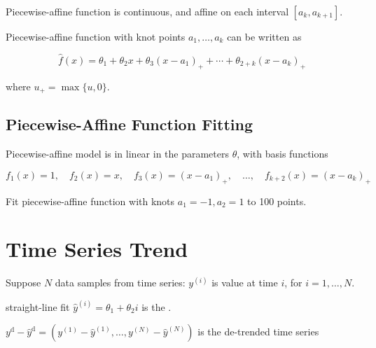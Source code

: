 \begin{proposition}
    Piecewise-affine function is continuous, and affine on each interval $ \left[a_{k}, a_{k+1}\right] $.
\end{proposition}

\begin{theorem}
    Piecewise-affine function with knot points $ a_{1}, \ldots, a_{k} $ can be written as

    $$
    \hat{f}(x)=\theta_{1}+\theta_{2} x+\theta_{3}\left(x-a_{1}\right)_{+}+\cdots+\theta_{2+k}\left(x-a_{k}\right)_{+}
    $$

    where $ u_{+}=\max \{u, 0\} $.
\end{theorem}



\subsection{Piecewise-Affine Function Fitting}

Piecewise-affine model is in linear in the parameters $ \theta $, with basis functions

$$
f_{1}(x)=1, \quad f_{2}(x)=x, \quad f_{3}(x)=\left(x-a_{1}\right)_{+}, \quad \ldots, \quad f_{k+2}(x)=\left(x-a_{k}\right)_{+}
$$

\begin{example}
    Fit piecewise-affine function with knots $ a_{1}=-1, a_{2}=1 $ to 100 points.
\end{example}

\section{Time Series Trend}

\begin{definition}
    Suppose $ N $ data samples from time series: $ y^{(i)} $ is value at time $ i $, for $ i=1, \ldots, N $.

    straight-line fit $ \hat{y}^{(i)}=\theta_{1}+\theta_{2} i $ is the .
\end{definition}

\begin{definition}
    $ y^{\mathrm{d}}-\hat{y}^{\mathrm{d}}=\left(y^{(1)}-\hat{y}^{(1)}, \ldots, y^{(N)}-\hat{y}^{(N)}\right) $ is the de-trended time series
\end{definition}

